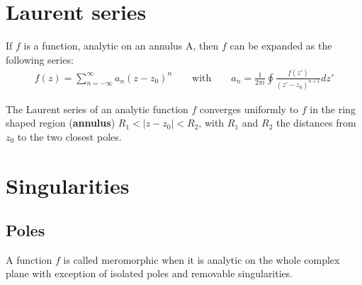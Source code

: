 \section{Laurent series}
    	
    	\begin{definition}\label{complexcalculus:laurent_series}
        	If $f$ is a function, analytic on an annulus A, then $f$ can be expanded as the following series:
        	\begin{gather}
        	        f(z) = \sum^{\infty}_{n=-\infty} a_n (z - z_0)^n \qquad \text{with} \qquad a_n = \frac{1}{2\pi i} \oint \frac{f(z')}{(z' - z_0)^{n+1}} dz'
		\end{gather}
	\end{definition}
        
        \begin{remark}
		The Laurent series of an analytic function $f$ converges uniformly to $f$ in the ring shaped region (\textbf{annulus}) $R_1 < |z - z_0| < R_2$, with $R_1$ and $R_2$ the distances from $z_0$ to the two closest poles.
        \end{remark}
        
    
\section{Singularities}
\subsection{Poles}
	
	
	\begin{definition}[Meromorphic]
		A function $f$ is called meromorphic when it is analytic on the whole complex plane with exception of isolated poles and removable singularities.
	\end{definition}
    
    
